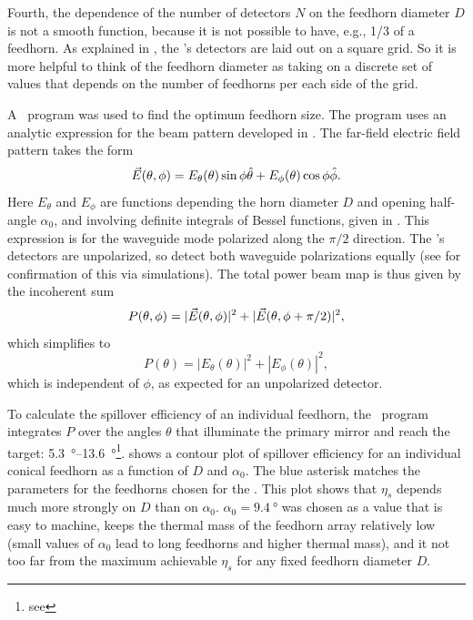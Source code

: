 Fourth, the dependence of the number of detectors $N$ on the feedhorn diameter $D$ is not a smooth function, because it is not possible to have, e.g., 1/3 of a feedhorn.
As explained in , the \Imager's detectors are laid out on a square grid.
So it is more helpful to think of the feedhorn diameter as taking on a discrete set of values that depends on the number of feedhorns per each side of the grid.

A \MATLAB\ program was used to find the optimum feedhorn size.
The program uses an analytic expression for the beam pattern developed in \cite{green_radiation_2006,narasimhan_modes_1971,}.
The far-field electric field pattern takes the form
\begin{equation}
    \vec{E}(\theta,\phi) = E_{\theta}(\theta) \sin{\phi} \hat{\theta} + E_{\phi}(\theta) \cos{\phi} \hat{\phi}.
\end{equation}
Here $E_{\theta}$ and $E_{\phi}$ are functions depending the horn diameter $D$ and opening half-angle $\alpha_0$, and involving definite integrals of Bessel functions, given in .
This expression is for the waveguide mode polarized along the $\pi/2$ direction.
The \Imager's detectors are unpolarized, so detect both waveguide polarizations equally (see  for confirmation of this via simulations).
The total power beam map is thus given by the incoherent sum
\begin{equation}
    P(\theta, \phi) = |\vec{E}(\theta, \phi)|^2 + |\vec{E}(\theta, \phi+\pi/2)|^2,
\end{equation}
which simplifies to 
\begin{equation}
    P(\theta) = |E_{\theta}(\theta)|^2 + |E_{\phi}(\theta)|^2,
\end{equation}
which is independent of $\phi$, as expected for an unpolarized detector.

To calculate the spillover efficiency of an individual feedhorn, the \MATLAB\ program integrates $P$ over the angles $\theta$ that illuminate the primary mirror and reach the target: \SIrange{5.3}{13.6}{\degree}\footnote{see }.
 shows a contour plot of spillover efficiency for an individual conical feedhorn as a function of $D$ and $\alpha_0$.
The blue asterisk matches the parameters for the feedhorns chosen for the \Imager.
This plot shows that $\eta_s$ depends much more strongly on $D$ than on $\alpha_0$.
$\alpha_0 = \SI{9.4}{\degree}$ was chosen as a value that is easy to machine, keeps the thermal mass of the feedhorn array relatively low (small values of $\alpha_0$ lead to long feedhorns and higher thermal mass), and it not too far from the maximum achievable $\eta_s$ for any fixed feedhorn diameter $D$.

